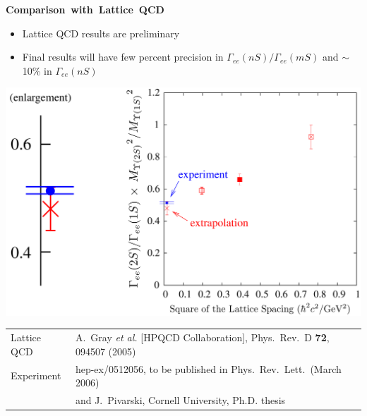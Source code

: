 \documentclass[landscape]{article}
\newenvironment{slide}[1][ ]{\mbox{\bf #1 } \vfill}{\vfill \mbox{ } \hfill \Large \arabic{page} \pagebreak}
\begin{document}
\begin{slide}[Comparison with Lattice QCD]

\begin{itemize}

  \item Lattice QCD results are preliminary

  \item Final results will have few percent precision in $\Gamma_{ee}(nS)/\Gamma_{ee}(mS)$ and $\sim$10\% in $\Gamma_{ee}(nS)$

\end{itemize}

\vspace{0.5 cm}
\begin{center}
  \includegraphics[width=0.75\linewidth]{latticespacingagain}
\end{center}

\Large
\vspace{0.5 cm}
\renewcommand{\arraystretch}{1.2}
\begin{tabular}{l l}
  Lattice QCD & A.~Gray {\it et al.} [HPQCD Collaboration], Phys.\ Rev.\ D {\bf 72}, 094507 (2005) \\
  Experiment & hep-ex/0512056, to be published in Phys.\ Rev.\ Lett.\ (March 2006) \\
             & and J.\ Pivarski, Cornell University, Ph.D. thesis
\end{tabular}

\end{slide}
\end{document}
